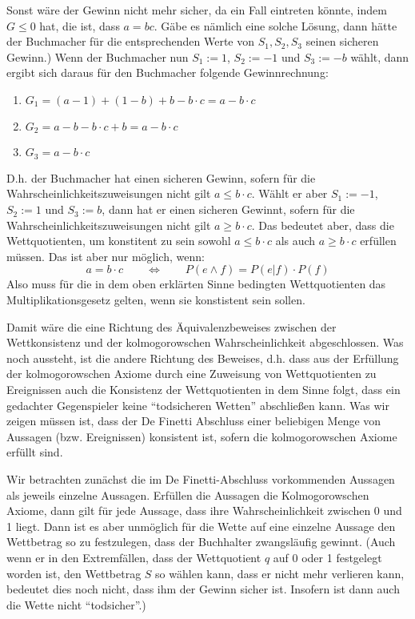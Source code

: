 \begin{enumerate}
{  Sonst wäre der Gewinn nicht mehr sicher, da ein Fall eintreten könnte, indem $G
  \leq 0$} hat, die ist, dass $a=bc$. Gäbe es nämlich eine solche Lösung, dann
  hätte der Buchmacher für die entsprechenden Werte von $S_1, S_2, S_3$ seinen sicheren Gewinn.) Wenn der Buchmacher nun $S_1 := 1$, $S_2 := -1$ und $S_3 := -b$ wählt, dann ergibt sich daraus für den Buchmacher folgende Gewinnrechnung:
  \begin{enumerate}
    \item $G_1 = (a-1) + (1-b) + b-b\cdot c = a - b\cdot c$
    \item $G_2 = a - b - b \cdot c + b = a - b\cdot c$
    \item $G_3 = a - b \cdot c$
  \end{enumerate}
  D.h. der Buchmacher hat einen sicheren Gewinn, sofern für die
  Wahrscheinlichkeitszuweisungen nicht gilt $a \leq b\cdot c$. 
  Wählt er aber $S_1 := -1$, $S_2 := 1$ und $S_3 := b$, dann hat er einen
  sicheren Gewinnt, sofern für die Wahrscheinlichkeitszuweisungen nicht gilt $a \geq b
  \cdot c$. Das bedeutet aber, dass die Wettquotienten, um konstitent zu sein
  sowohl $a \leq b\cdot c$ als auch $a \geq b \cdot c$ erfüllen müssen. Das
  ist aber nur möglich, wenn:
  \[ a = b\cdot c \qquad \Leftrightarrow \qquad 
  P(e \wedge f) = P(e|f)\cdot P(f) \]
  Also muss für die in dem oben erklärten Sinne bedingten Wettquotienten das
  Multiplikationsgesetz gelten, wenn sie konstistent sein sollen.
\end{enumerate}

Damit wäre die eine Richtung des Äquivalenzbeweises zwischen der Wettkonsistenz
und der kolmogorowschen Wahrscheinlichkeit abgeschlossen. Was noch aussteht,
ist die andere Richtung des Beweises, d.h. dass aus der Erfüllung der
kolmogorowschen Axiome durch eine Zuweisung von Wettquotienten zu Ereignissen
auch die Konsistenz der Wettquotienten in dem Sinne folgt, dass ein gedachter
Gegenspieler keine "`todsicheren Wetten"' abschließen kann. Was wir zeigen
müssen ist, dass der De Finetti Abschluss einer beliebigen Menge von Aussagen
(bzw. Ereignissen) konsistent ist, sofern die kolmogorowschen Axiome erfüllt
sind.
 
Wir betrachten zunächst die im De Finetti-Abschluss vorkommenden Aussagen
als jeweils einzelne Aussagen. Erfüllen die Aussagen die Kolmogorowschen
Axiome, dann gilt für jede Aussage, dass ihre Wahrscheinlichkeit zwischen 0 und 1 liegt. 
Dann ist es aber unmöglich für die
Wette auf eine einzelne Aussage den Wettbetrag so zu festzulegen, dass der
Buchhalter zwangsläufig gewinnt. (Auch wenn er in den Extremfällen, dass der
Wettquotient $q$ auf 0 oder 1 festgelegt worden ist, den Wettbetrag $S$ so
wählen kann, dass er nicht mehr verlieren kann, bedeutet dies noch nicht, dass
ihm der Gewinn sicher ist. Insofern ist dann auch die Wette nicht
"`todsicher"'.)


